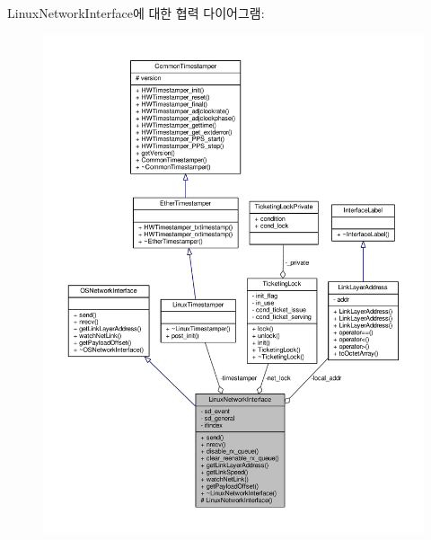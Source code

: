 Linux\+Network\+Interface에 대한 협력 다이어그램\+:
\nopagebreak
\begin{figure}[H]
\begin{center}
\leavevmode
\includegraphics[width=350pt]{class_linux_network_interface__coll__graph}
\end{center}
\end{figure}
